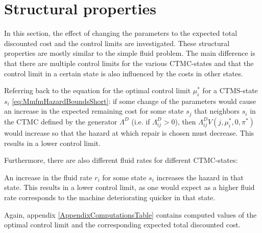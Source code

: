 \section{Structural properties}
In this section, the effect of changing the parameters to the expected total discounted cost and the control limits are investigated.
These structural properties are mostly similar to the simple fluid problem.
The main difference is that there are multiple control limits for the various CTMC-states and that the control limit in a certain state is also influenced by the costs in other states.

\begin{remark}
	Referring back to the equation for the optimal control limit $\mu_i^*$ for a CTMS-state $s_i$ \eqref{eq:MmfmHazardBoundsShort}: if some change of the parameters would cause an increase in the expected remaining cost for some state $s_j$ that neighbors $s_i$ in the CTMC defined by the generator $\Lambda^D$ (i.e. if $\Lambda^D_{ij}>0$), then $\Lambda^D_{ij}V(j,\mu_i^*,0,\pi^*)$ would increase so that the hazard at which repair is chosen must decrease.
	This results in a lower control limit.
\end{remark}

Furthermore, there are also different fluid rates for different CTMC-states:
\begin{remark}
	An increase in the fluid rate $r_i$ for some state $s_i$ increases the hazard in that state.
	This results in a lower control limit, as one would expect as a higher fluid rate corresponds to the machine deteriorating quicker in that state.
\end{remark}

Again, appendix \ref{AppendixComputationsTable} contains computed values of the optimal control limit and the corresponding expected total discounted cost.